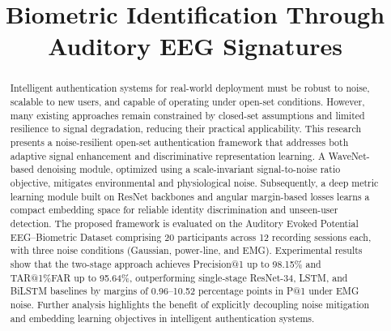\documentclass[conference]{IEEEtran}
\begin{document}
\title{Biometric Identification Through Auditory EEG Signatures}

\author{
\and
{}
\and
{}
\and
{}
}

\maketitle

\begin{abstract}
Intelligent authentication systems for real-world deployment must be robust to noise, scalable to new users, and capable of operating under open-set conditions. However, many existing approaches remain constrained by closed-set assumptions and limited resilience to signal degradation, reducing their practical applicability. This research presents a noise-resilient open-set authentication framework that addresses both adaptive signal enhancement and discriminative representation learning. A WaveNet-based denoising module, optimized using a scale-invariant signal-to-noise ratio objective, mitigates environmental and physiological noise. Subsequently, a deep metric learning module built on ResNet backbones and angular margin-based losses learns a compact embedding space for reliable identity discrimination and unseen-user detection. The proposed framework is evaluated on the Auditory Evoked Potential EEG--Biometric Dataset comprising 20 participants across 12 recording sessions each, with three noise conditions (Gaussian, power-line, and EMG). Experimental results show that the two-stage approach achieves Precision@1 up to 98.15\% and TAR@1\%FAR up to 95.64\%, outperforming single-stage ResNet-34, LSTM, and BiLSTM baselines by margins of 0.96--10.52 percentage points in P@1 under EMG noise. Further analysis highlights the benefit of explicitly decoupling noise mitigation and embedding learning objectives in intelligent authentication systems.
\end{abstract}
\end{document}
